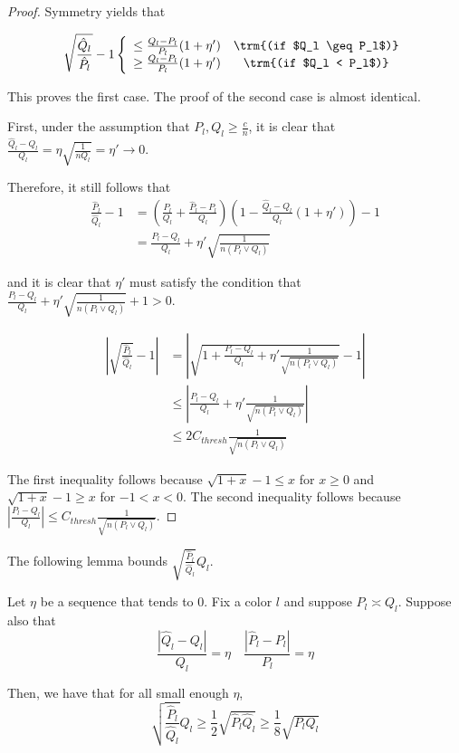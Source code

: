 \documentclass{article}
\begin{document}
\begin{proof}
Symmetry yields that 

\begin{align*}
\sqrt{ \frac{\hat{Q}_l}{\hat{P}_l} } - 1  &
   \left\{ \begin{array}{cc}
      \leq \frac{Q_l - P_l}{P_l} (1 + \eta') & \trm{(if $Q_l \geq P_l$)} \\
      \geq \frac{Q_l - P_l}{P_l} (1 + \eta') & \trm{(if $Q_l < P_l$)} 
     \end{array} \right. \\
\end{align*}

This proves the first case. The proof of the second case is almost identical. 

First, under the assumption that $P_l, Q_l \geq \frac{c}{n}$, it is clear that $\frac{\hat{Q}_l - Q_l}{Q_l} = \eta \sqrt{ \frac{1}{ n Q_l} } = \eta' \rightarrow 0$. 

Therefore, it still follows that
\begin{align*}
\frac{\hat{P}_l}{\hat{Q}_l} - 1 &= 
     \left( \frac{P_l}{Q_l} + \frac{\hat{P}_l - P_l}{Q_l} \right)
     \left( 1 - \frac{\hat{Q}_l - Q_l}{Q_l} ( 1 + \eta') \right) - 1 \\
 &= \frac{P_l - Q_l}{Q_l} + \eta' \sqrt{ \frac{1}{ n (P_l \vee Q_l)} } 
\end{align*}

and it is clear that $\eta'$ must satisfy the condition that $\frac{P_l - Q_l}{Q_l} + \eta'\sqrt{ \frac{1}{n (P_l \vee Q_l)} } + 1 > 0$. 



\begin{align*}
\left| \sqrt{ \frac{\hat{P}_l}{\hat{Q}_l} } - 1 \right| &= 
 \left|  \sqrt{ 1 + \frac{P_l - Q_l}{Q_l} + \eta' \frac{1}{\sqrt{n (P_l \vee Q_l)} }}
   -1  \right| \\
  &\leq \left| \frac{P_l - Q_l}{Q_l} + \eta' \frac{1}{\sqrt{ n (P_l \vee Q_l)}}        \right| \\
 &\leq 2 C_{thresh} \frac{1}{\sqrt{n (P_l \vee Q_l)} } 
\end{align*}

The first inequality follows because $ \sqrt{1 + x} - 1 \leq x$ for $x \geq 0$ and $\sqrt{ 1 + x} - 1 \geq x$ for $-1 < x < 0$. 
The second inequality follows because $\left| \frac{P_l - Q_l}{Q_l} \right| \leq C_{thresh} \frac{1}{\sqrt{n (P_l \vee Q_l)}} $. 

\end{proof}


The following lemma bounds $\sqrt{ \frac{\hat{P}_l}{\hat{Q}_l} } Q_l$. 
\begin{lemma}
\label{lem:sqrt_ratio_times_ql}

Let $\eta$ be a sequence that tends to 0. Fix a color $l$ and suppose $P_l \asymp Q_l$. Suppose also that
\[
\frac{|\hat{Q}_l - Q_l|}{Q_l} = \eta \quad 
\frac{|\hat{P}_l - P_l|}{P_l} = \eta
\]

Then, we have that for all small enough $\eta$, 
\[
\sqrt{ \frac{\hat{P}_l}{\hat{Q}_l} } Q_l \geq \frac{1}{2} \sqrt{\hat{P}_l \hat{Q}_l} \geq
  \frac{1}{8} \sqrt{P_l Q_l}
\]
\end{lemma}
\end{document}
